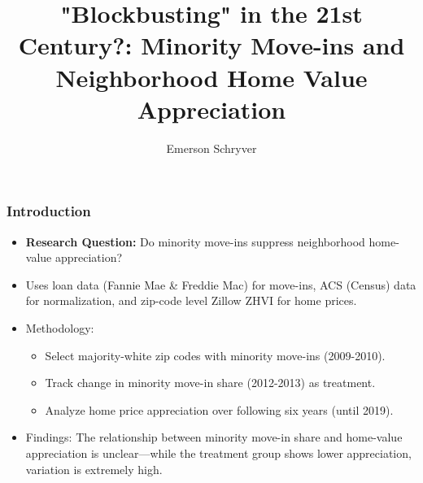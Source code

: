 \documentclass[aspectratio=169]{beamer}
\title[Minority Move-Ins and Home Appreciation]{"Blockbusting" in the 21st Century?: Minority Move-ins and Neighborhood Home Value Appreciation}
\author{Emerson Schryver}
\begin{document}
\begin{frame}
    \maketitle
\end{frame}
\begin{frame}
\frametitle{Introduction}
\begin{itemize}
    \item \textbf{Research Question:} Do minority move-ins suppress neighborhood home-value appreciation?
    \item Uses loan data (Fannie Mae \& Freddie Mac) for move-ins, ACS (Census) data for normalization, and zip-code level Zillow ZHVI for home prices.
    \item Methodology:
    \begin{itemize}
        \item Select majority-white zip codes with minority move-ins (2009-2010).
        \item Track change in minority move-in share (2012-2013) as treatment.
        \item Analyze home price appreciation over following six years (until 2019).
    \end{itemize}
    \item Findings: The relationship between minority move-in share and home-value appreciation is unclear—while the treatment group shows lower appreciation, variation is extremely high.
\end{itemize}
\end{frame}
        
    
\end{document}
